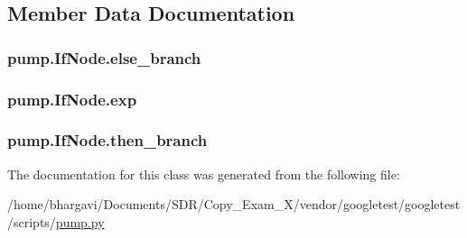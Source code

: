 \subsection{Member Data Documentation}
\subsubsection[{\texorpdfstring{else\+\_\+branch}{else_branch}}]{\setlength{\rightskip}{0pt plus 5cm}pump.\+If\+Node.\+else\+\_\+branch}\hypertarget{classpump_1_1_if_node_a12e422b16ed4291f15cd95cd6e7f81eb}{}\label{classpump_1_1_if_node_a12e422b16ed4291f15cd95cd6e7f81eb}
\subsubsection[{\texorpdfstring{exp}{exp}}]{\setlength{\rightskip}{0pt plus 5cm}pump.\+If\+Node.\+exp}\hypertarget{classpump_1_1_if_node_a92042e4262196ffd7366350539f512d8}{}\label{classpump_1_1_if_node_a92042e4262196ffd7366350539f512d8}
\subsubsection[{\texorpdfstring{then\+\_\+branch}{then_branch}}]{\setlength{\rightskip}{0pt plus 5cm}pump.\+If\+Node.\+then\+\_\+branch}\hypertarget{classpump_1_1_if_node_aa9e2e488564629f8dc0d64d165a19ffa}{}\label{classpump_1_1_if_node_aa9e2e488564629f8dc0d64d165a19ffa}


The documentation for this class was generated from the following file\+:\begin{DoxyCompactItemize}
\item 
/home/bhargavi/\+Documents/\+S\+D\+R/\+Copy\+\_\+\+Exam\+\_\+X/vendor/googletest/googletest/scripts/\hyperlink{pump_8py}{pump.\+py}\end{DoxyCompactItemize}
